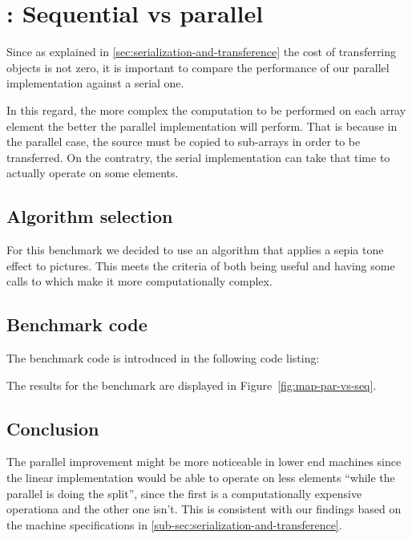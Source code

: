 \section{: Sequential vs parallel}

Since as explained in \ref{sec:serialization-and-transference} the cost of transferring objects is not zero, it is important to compare the performance of our parallel implementation against a serial one.

In this regard, the more complex the computation to be performed on each array element the better the parallel implementation will perform. That is because in the parallel case, the source \ttarray{} must be copied to sub-arrays in order to be transferred. On the contratry, the serial implementation can take that time to actually operate on some elements.

\subsection{Algorithm selection}
For this benchmark we decided to use an algorithm that applies a sepia tone effect to pictures. This meets the criteria of both being useful and having some calls to  which make it more computationally complex.

\subsection{Benchmark code}
The benchmark code is introduced in the following code listing:


The results for the benchmark are displayed in Figure~\ref{fig:map-par-vs-seq}.

\subsection{Conclusion}
The parallel improvement might be more noticeable in lower end machines since the linear implementation would be able to operate on less elements ``while the parallel is doing the split'', since the first is a computationally expensive operationa and the other one isn't. This is consistent with our findings based on the machine specifications in \ref{sub-sec:serialization-and-transference}.

\pagebreak